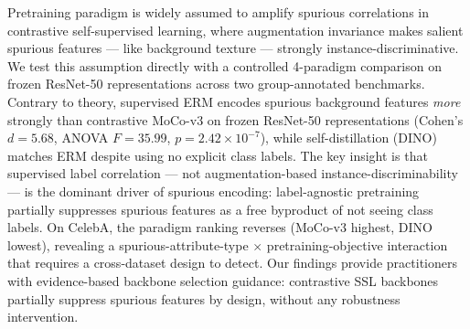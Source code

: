 Pretraining paradigm is widely assumed to amplify spurious correlations in contrastive self-supervised learning, where augmentation invariance makes salient spurious features --- like background texture --- strongly instance-discriminative. We test this assumption directly with a controlled 4-paradigm comparison on frozen ResNet-50 representations across two group-annotated benchmarks. Contrary to theory, supervised ERM encodes spurious background features \textit{more} strongly than contrastive MoCo-v3 on frozen ResNet-50 representations (Cohen's $d = 5.68$, ANOVA $F = 35.99$, $p = 2.42 \times 10^{-7}$), while self-distillation (DINO) matches ERM despite using no explicit class labels. The key insight is that supervised label correlation --- not augmentation-based instance-discriminability --- is the dominant driver of spurious encoding: label-agnostic pretraining partially suppresses spurious features as a free byproduct of not seeing class labels. On CelebA, the paradigm ranking reverses (MoCo-v3 highest, DINO lowest), revealing a spurious-attribute-type $\times$ pretraining-objective interaction that requires a cross-dataset design to detect. Our findings provide practitioners with evidence-based backbone selection guidance: contrastive SSL backbones partially suppress spurious features by design, without any robustness intervention.
